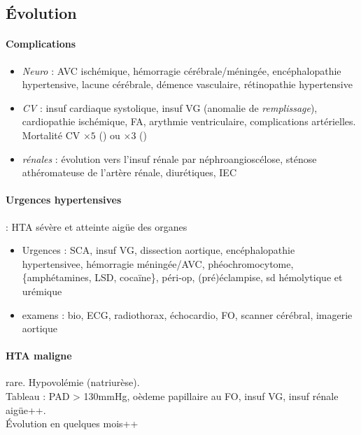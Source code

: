 \subsection{Évolution}
\paragraph{Complications}
\begin{itemize}
  \item 
\textit{Neuro}  : AVC ischémique, hémorragie cérébrale/méningée, encéphalopathie
hypertensive, lacune cérébrale, démence vasculaire, rétinopathie hypertensive
\item \textit{CV}  : insuf cardiaque systolique, insuf VG (anomalie de
  \textit{remplissage}), cardiopathie ischémique, FA, arythmie
  ventriculaire, complications artérielles. Mortalité CV $\times 5$ (\male) ou
  $\times 3$ (\female)
\item \textit{rénales} : évolution vers l'insuf rénale par néphroangioscélose,
  sténose athéromateuse de l'artère rénale, diurétiques, IEC
\end{itemize}

\paragraph{Urgences hypertensives} : HTA sévère et atteinte aigüe des organes
\begin{itemize}
  \item Urgences : SCA, insuf VG, dissection aortique, encéphalopathie
    hypertensivee, hémorragie méningée/AVC, phéochromocytome, \{amphétamines, 
    LSD, cocaïne\}, péri-op, (pré)éclampise, sd hémolytique et urémique
  \item examens : bio, ECG, radiothorax, échocardio, \gls{FO},
    scanner cérébral, imagerie aortique
\end{itemize}

\paragraph{HTA maligne} rare. Hypovolémie (natriurèse). \\
Tableau : PAD > 130mmHg, oèdeme papillaire au FO, insuf VG, insuf rénale
aigüe++. \\
Évolution en quelques mois++

